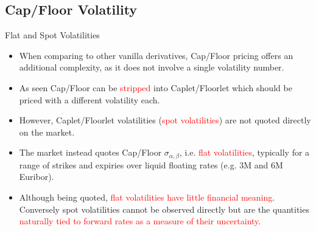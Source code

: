 \documentclass{beamer}
\begin{document}
\subsection{Cap/Floor Volatility}
\begin{frame}{Flat and Spot Volatilities}
	\begin{itemize}
		\item When comparing to other vanilla derivatives, Cap/Floor pricing offers an additional complexity, as it does not involve a single volatility number. 
		\item As seen Cap/Floor can be \textcolor{red}{stripped} into Caplet/Floorlet which should be priced with a different volatility each. 
		\item However, Caplet/Floorlet volatilities (\textcolor{red}{spot volatilities}) are not quoted directly on the market.
		\item The market instead quotes Cap/Floor $\sigma_{\alpha,\beta}$, i.e. \textcolor{red}{flat volatilities}, typically for a range of strikes and expiries over liquid floating rates (e.g. 3M and 6M Euribor).
		\item Although being quoted, \textcolor{red}{flat volatilities have little financial meaning}. Conversely spot volatilities cannot be observed directly but are the quantities \textcolor{red}{naturally tied to forward rates as a measure of their uncertainty}.
	\end{itemize}
\end{frame}
\end{document}
